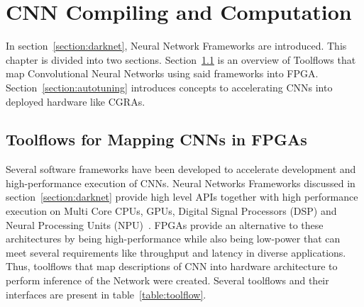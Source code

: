 \chapter{CNN Compiling and Computation}
\label{chapter:CNNVersat}

\quad In section~\ref{section:darknet}, Neural Network Frameworks are introduced. This chapter is divided into two sections.
 Section~\ref{section:toolflow} is an overview of Toolflows that map Convolutional
Neural Networks using said frameworks into FPGA. Section~\ref{section:autotuning} introduces concepts to accelerating CNNs into 
deployed hardware like CGRAs.


%

\section{Toolflows for Mapping CNNs in FPGAs}
\label{section:toolflow}

\quad Several software frameworks have been developed to accelerate development and high-performance execution of CNNs.
 Neural Networks Frameworks discussed in section~\ref{section:darknet} provide high level APIs together with high performance execution on Multi Core CPUs, GPUs, Digital Signal Processors (DSP) and Neural Processing Units (NPU)~\cite{smartphones}.
FPGAs provide an alternative to these architectures by being high-performance while also being low-power that can meet several requirements
like throughput and latency in diverse applications. Thus, toolflows that map descriptions of CNN into hardware architecture to perform inference of the Network
were created. Several toolflows and their interfaces are present in table~\ref{table:toolflow}.

